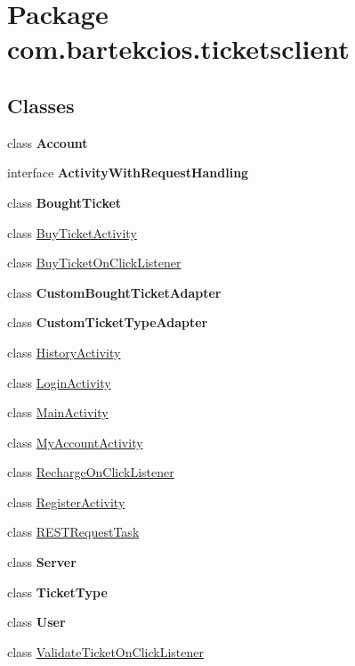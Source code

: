 \hypertarget{namespacecom_1_1bartekcios_1_1ticketsclient}{}\section{Package com.\+bartekcios.\+ticketsclient}
\label{namespacecom_1_1bartekcios_1_1ticketsclient}
\subsection*{Classes}
\begin{DoxyCompactItemize}
\item 
class {\bfseries Account}
\item 
interface {\bfseries Activity\+With\+Request\+Handling}
\item 
class {\bfseries Bought\+Ticket}
\item 
class \hyperlink{classcom_1_1bartekcios_1_1ticketsclient_1_1_buy_ticket_activity}{Buy\+Ticket\+Activity}
\item 
class \hyperlink{classcom_1_1bartekcios_1_1ticketsclient_1_1_buy_ticket_on_click_listener}{Buy\+Ticket\+On\+Click\+Listener}
\item 
class {\bfseries Custom\+Bought\+Ticket\+Adapter}
\item 
class {\bfseries Custom\+Ticket\+Type\+Adapter}
\item 
class \hyperlink{classcom_1_1bartekcios_1_1ticketsclient_1_1_history_activity}{History\+Activity}
\item 
class \hyperlink{classcom_1_1bartekcios_1_1ticketsclient_1_1_login_activity}{Login\+Activity}
\item 
class \hyperlink{classcom_1_1bartekcios_1_1ticketsclient_1_1_main_activity}{Main\+Activity}
\item 
class \hyperlink{classcom_1_1bartekcios_1_1ticketsclient_1_1_my_account_activity}{My\+Account\+Activity}
\item 
class \hyperlink{classcom_1_1bartekcios_1_1ticketsclient_1_1_recharge_on_click_listener}{Recharge\+On\+Click\+Listener}
\item 
class \hyperlink{classcom_1_1bartekcios_1_1ticketsclient_1_1_register_activity}{Register\+Activity}
\item 
class \hyperlink{classcom_1_1bartekcios_1_1ticketsclient_1_1_r_e_s_t_request_task}{R\+E\+S\+T\+Request\+Task}
\item 
class {\bfseries Server}
\item 
class {\bfseries Ticket\+Type}
\item 
class {\bfseries User}
\item 
class \hyperlink{classcom_1_1bartekcios_1_1ticketsclient_1_1_validate_ticket_on_click_listener}{Validate\+Ticket\+On\+Click\+Listener}
\end{DoxyCompactItemize}

